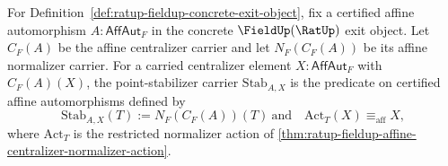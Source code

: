 \begin{definition}
\label{def:ratup-fieldup-affine-centralizer-normalizer-point-stabilizer}
For Definition~\ref{def:ratup-fieldup-concrete-exit-object}, fix a certified
affine automorphism $A:\mathsf{AffAut}_F$ in the concrete $\FieldUp(\RatUp)$
exit object. Let $C_F(A)$ be the affine centralizer carrier and let
$N_F(C_F(A))$ be its affine normalizer carrier. For a carried centralizer
element $X:\mathsf{AffAut}_F$ with $C_F(A)(X)$, the point-stabilizer carrier
$\mathrm{Stab}_{A,X}$ is the predicate on certified affine automorphisms
defined by
$$
\mathrm{Stab}_{A,X}(T):=N_F(C_F(A))(T)\ \text{and}\quad
\mathrm{Act}_T(X)\equiv_{\mathrm{aff}}X,
$$
where $\mathrm{Act}_T$ is the restricted normalizer action of
\autoref{thm:ratup-fieldup-affine-centralizer-normalizer-action}.
\end{definition}

